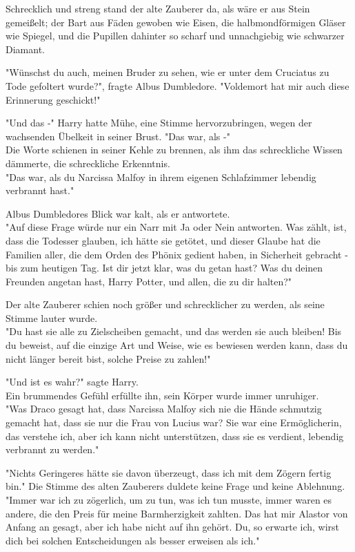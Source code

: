 {Schrecklich und streng stand der alte Zauberer da, als wäre er aus Stein gemeißelt; der Bart aus Fäden gewoben wie Eisen, die halbmondförmigen Gläser wie Spiegel, und die Pupillen dahinter so scharf und unnachgiebig wie schwarzer Diamant.

"Wünschst du auch, meinen Bruder zu sehen, wie er unter dem Cruciatus zu Tode gefoltert wurde?", fragte Albus Dumbledore. "Voldemort hat mir auch diese Erinnerung geschickt!"

"Und das -" Harry hatte Mühe, eine Stimme hervorzubringen, wegen der wachsenden Übelkeit in seiner Brust. "Das war, als -"\\ Die Worte schienen in seiner Kehle zu brennen, als ihm das schreckliche Wissen dämmerte, die schreckliche Erkenntnis.\\ "Das war, als du Narcissa Malfoy in ihrem eigenen Schlafzimmer lebendig verbrannt hast."

Albus Dumbledores Blick war kalt, als er antwortete.\\ "Auf diese Frage würde nur ein Narr mit Ja oder Nein antworten. Was zählt, ist, dass die Todesser glauben, ich hätte sie getötet, und dieser Glaube hat die Familien aller, die dem Orden des Phönix gedient haben, in Sicherheit gebracht - bis zum heutigen Tag. Ist dir jetzt klar, was du getan hast? Was du deinen Freunden angetan hast, Harry Potter, und allen, die zu dir halten?"

Der alte Zauberer schien noch größer und schrecklicher zu werden, als seine Stimme lauter wurde.\\ "Du hast sie alle zu Zielscheiben gemacht, und das werden sie auch bleiben! Bis du beweist, auf die einzige Art und Weise, wie es bewiesen werden kann, dass du nicht länger bereit bist, solche Preise zu zahlen!"

"Und ist es wahr?" sagte Harry.\\ Ein brummendes Gefühl erfüllte ihn, sein Körper wurde immer unruhiger.\\ "Was Draco gesagt hat, dass Narcissa Malfoy sich nie die Hände schmutzig gemacht hat, dass sie nur die Frau von Lucius war? Sie war eine Ermöglicherin, das verstehe ich, aber ich kann nicht unterstützen, dass sie es verdient, lebendig verbrannt zu werden."

"Nichts Geringeres hätte sie davon überzeugt, dass ich mit dem Zögern fertig bin." Die Stimme des alten Zauberers duldete keine Frage und keine Ablehnung.\\ "Immer war ich zu zögerlich, um zu tun, was ich tun musste, immer waren es andere, die den Preis für meine Barmherzigkeit zahlten. Das hat mir Alastor von Anfang an gesagt, aber ich habe nicht auf ihn gehört. Du, so erwarte ich, wirst dich bei solchen Entscheidungen als besser erweisen als ich."

}
